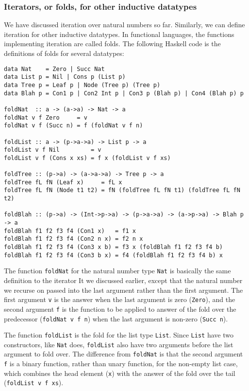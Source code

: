 \subsubsection{Iterators, or folds, for other inductive datatypes}
\label{sssec:folds}
We have discussed iteration over natural numbers so far.
Similarly, we can define iteration for other inductive datatypes.
In functional languages, the functions implementing iteration are called folds.
The following Haskell code is the definitions of folds for several datatypes:
{\small
\begin{verbatim}
data Nat    = Zero | Succ Nat
data List p = Nil | Cons p (List p)
data Tree p = Leaf p | Node (Tree p) (Tree p)
data Blah p = Con1 p | Con2 Int p | Con3 p (Blah p) | Con4 (Blah p) p

foldNat  :: a -> (a->a) -> Nat -> a
foldNat v f Zero     = v
foldNat v f (Succ n) = f (foldNat v f n)

foldList :: a -> (p->a->a) -> List p -> a
foldList v f Nil         = v
foldList v f (Cons x xs) = f x (foldList v f xs)

foldTree :: (p->a) -> (a->a->a) -> Tree p -> a
foldTree fL fN (Leaf x)     = fL x
foldTree fL fN (Node t1 t2) = fN (foldTree fL fN t1) (foldTree fL fN t2)

foldBlah :: (p->a) -> (Int->p->a) -> (p->a->a) -> (a->p->a) -> Blah p -> a
foldBlah f1 f2 f3 f4 (Con1 x)   = f1 x
foldBlah f1 f2 f3 f4 (Con2 n x) = f2 n x
foldBlah f1 f2 f3 f4 (Con3 x b) = f3 x (foldBlah f1 f2 f3 f4 b)
foldBlah f1 f2 f3 f4 (Con3 b x) = f4 (foldBlah f1 f2 f3 f4 b) x
\end{verbatim}
}
The function \texttt{foldNat} for the natural number type \texttt{Nat}
is basically the same definition to the iterator \textsf{It} we discussed
earlier, except that the natural number we recurse on passed into
the last argument rather than the first argument. The first argument \texttt{v}
is the answer when the last argument is zero (\texttt{Zero}), and
the second argument \texttt{f} is the function to be applied to answer of
the fold over the predecessor (\texttt{foldNat v f n}) when the last argument
is non-zero (\texttt{Succ n}).

The function \texttt{foldList} is the fold for the list type \texttt{List}.
Since \texttt{List} have two constructors, like \texttt{Nat} does,
\texttt{foldList} also have two arguments before the list argument to
fold over. The difference from \texttt{foldNat} is that the second argument
\texttt{f} is a binary function, rather than unary function,
for the non-empty list case, which combines the head element (\texttt{x})
with the answer of the fold over the tail (\texttt{foldList v f xs}).

